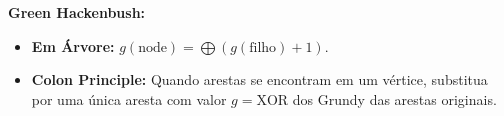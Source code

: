 \textbf{Green Hackenbush:} 
\begin{itemize}[leftmargin=*, nosep]
    \item \textbf{Em Árvore:} $g(\text{node}) = \bigoplus (g(\text{filho}) + 1)$.
    \item \textbf{Colon Principle:} Quando arestas se encontram em um vértice, substitua por uma única aresta com valor $g = \text{XOR}$ dos Grundy das arestas originais.
\end{itemize}
